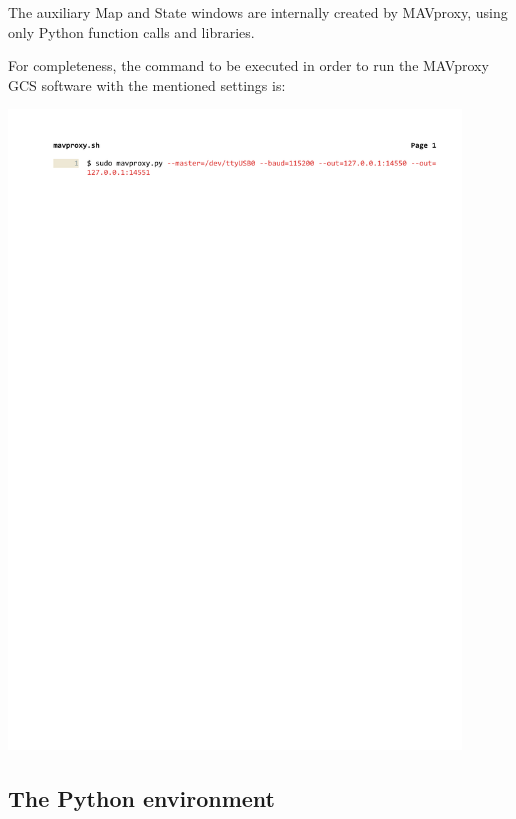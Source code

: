 The auxiliary Map and State windows are internally created by MAVproxy, using only Python function calls and libraries.

For completeness, the command to be executed in order to run the MAVproxy GCS software with the mentioned settings is:
\begin{center}
\includegraphics[width=0.9\textwidth,clip,trim={2.5cm 26.6cm 1cm 2.3cm}]{./figures/mavproxysh.pdf}
\end{center}


\subsection{The Python environment}

